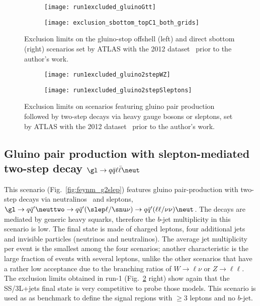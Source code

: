 \begin{figure}[t]
\centering
\begin{subfigure}[t]{0.55\textwidth}{\texttt{[image: run1excluded\_gluinoGtt]}} \caption{} \end{subfigure}
\begin{subfigure}[t]{0.38\textwidth}{\texttt{[image: exclusion\_sbottom\_topC1\_both\_grids]}} \caption{} \end{subfigure}
\caption{Exclusion limits on the gluino-stop offshell (left) and direct sbottom (right) scenarios 
set by ATLAS with the 2012 dataset~\cite{DraftSquarkGluinoSummaryPaper}
prior to the author's work.}
\label{fig:run1excl_3rdgen}
\end{figure}


\begin{figure}[t]
\centering
\begin{subfigure}[t]{0.49\textwidth}{\texttt{[image: run1excluded\_gluino2stepWZ]}} \caption{} \end{subfigure} 
\begin{subfigure}[t]{0.49\textwidth}{\texttt{[image: run1excluded\_gluino2stepSleptons]}} \caption{} \end{subfigure}
\caption{Exclusion limits on scenarios featuring gluino pair production followed by two-step decays via heavy gauge bosons or sleptons, 
set by ATLAS with the 2012 dataset~\cite{DraftSquarkGluinoSummaryPaper}
prior to the author's work.}
\label{fig:run1excluded_1stgen}
\end{figure}

\subsection{Gluino pair production with slepton-mediated two-step decay $\gl\to q\bar q\ell\bar\ell\neut$}
\label{subsec:signals_g2slep}

This scenario (Fig.~\ref{fig:feynm_g2slep}) features gluino pair-production with two-step decays via neutralinos \neuttwo\ and sleptons, 
$\gl\to q\bar{q}'\neuttwo \to q\bar{q}'(\slep\ell/\snu\nu) \to q\bar{q}'(\ell\ell/\nu\nu)\neut$. 
The decays are mediated by generic heavy squarks, therefore the $b$-jet multiplicity in this scenario is low. 
The final state is made of charged leptons, four additional jets and invisible particles (neutrinos and neutralinos). 
The average jet multiplicity per event is the smallest among the four scenarios;  
another characteristic is the large fraction of events with several leptons, 
unlike the other scenarios that have a rather low acceptance due to the branching ratios of $W\to\ell\nu$ or $Z\to\ell\ell$. 
The exclusion limits obtained in run-1 (Fig.~\ref{fig:run1excluded_1stgen} right) show again that the SS/3L+jets final state 
is very competitive to probe those models. 
This scenario is used as as benchmark to define the signal regions with $\ge 3$ leptons and no $b$-jet. 


